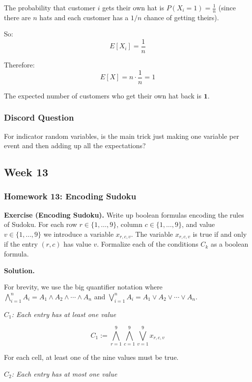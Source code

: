 \documentclass{article}
\theoremstyle{theorem}
\theoremstyle{definition}
\theoremstyle{remark}
\begin{document}
The probability that customer $i$ gets their own hat is $P(X_i = 1) = \frac{1}{n}$ (since there are $n$ hats and each customer has a $1/n$ chance of getting theirs).

So:
\[
E[X_i] = \frac{1}{n}
\]

Therefore:
\[
E[X] = n \cdot \frac{1}{n} = 1
\]

The expected number of customers who get their own hat back is $\mathbf{1}$.

\vspace{0.4cm}

\subsubsection{Discord Question}

For indicator random variables, is the main trick just making one variable per event and then adding up all the expectations?

\subsection{Week 13}

\subsubsection{Homework 13: Encoding Sudoku}

\textbf{Exercise (Encoding Sudoku).}
Write up boolean formulas encoding the rules of Sudoku. For each row $r \in \{1, \ldots, 9\}$, column $c \in \{1, \ldots, 9\}$, and value $v \in \{1, \ldots, 9\}$ we introduce a variable $x_{r,c,v}$. The variable $x_{r,c,v}$ is true if and only if the entry $(r, c)$ has value $v$. Formalize each of the conditions $C_k$ as a boolean formula.

\textbf{Solution.}

For brevity, we use the big quantifier notation where $\bigwedge_{i=1}^{n} A_i = A_1 \land A_2 \land \cdots \land A_n$ and $\bigvee_{i=1}^{n} A_i = A_1 \lor A_2 \lor \cdots \lor A_n$.

\vspace{0.2cm}
\textit{$C_1$: Each entry has at least one value}

\[
C_1 := \bigwedge_{r=1}^{9} \bigwedge_{c=1}^{9} \bigvee_{v=1}^{9} x_{r,c,v}
\]

For each cell, at least one of the nine values must be true.

\vspace{0.2cm}
\textit{$C_2$: Each entry has at most one value}
\end{document}
